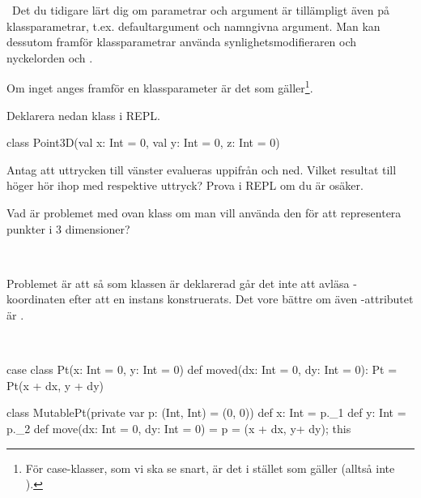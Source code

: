 
\QUESTBEGIN

\Task \what~Det du tidigare lärt dig om parametrar och argument är tillämpligt även på klassparametrar, t.ex. defaultargument och namngivna argument. Man kan dessutom framför klassparametrar använda synlighetsmodifieraren  och nyckelorden  och .

Om inget anges framför en klassparameter är det  som gäller\footnote{För case-klasser, som vi ska se snart, är det i stället  som gäller (alltså inte ).}.

Deklarera nedan klass i REPL.

\begin{Code}
class Point3D(val x: Int = 0, val y: Int = 0, z: Int = 0)
\end{Code}

\Subtask Antag att uttrycken till vänster evalueras uppifrån och ned. Vilket resultat till höger hör ihop med respektive uttryck? Prova i REPL om du är osäker.

\begin{ConceptConnections}

\end{ConceptConnections}

\Subtask Vad är problemet med ovan klass om man vill använda den för att representera punkter i 3 dimensioner?

\SOLUTION

\TaskSolved \what~

\SubtaskSolved

\begin{ConceptConnections}

\end{ConceptConnections}

\SubtaskSolved Problemet är att så som klassen  är deklarerad går det inte att avläsa -koordinaten efter att en instans konstruerats. Det vore bättre om även -attributet är .

\QUESTEND




\QUESTBEGIN

\Task \what~\TODO

\begin{Code}
case class Pt(x: Int = 0, y: Int = 0) {
  def moved(dx: Int = 0, dy: Int = 0): Pt = Pt(x + dx, y + dy)
}

class MutablePt(private var p: (Int, Int) = (0, 0)) {
  def x: Int = p._1
  def y: Int = p._2
  def move(dx: Int = 0, dy: Int = 0) = { p = (x + dx, y+ dy); this }
}
\end{Code}


